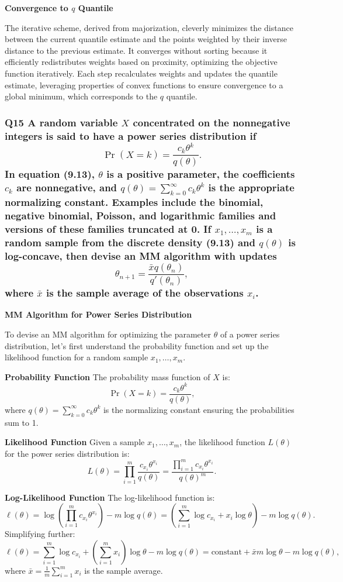 \documentclass[8pt]{article}
\begin{document}
{\textbf{Convergence to \(q\) Quantile}

The iterative scheme, derived from majorization, cleverly minimizes the distance between the current quantile estimate and the points weighted by their inverse distance to the previous estimate. It converges without sorting because it efficiently redistributes weights based on proximity, optimizing the objective function iteratively. Each step recalculates weights and updates the quantile estimate, leveraging properties of convex functions to ensure convergence to a global minimum, which corresponds to the \(q\) quantile.

\subsubsection*{Q15 A random variable \(X\) concentrated on the nonnegative integers is said to have a power series distribution if
\[
\Pr(X = k) = \frac{c_k \theta^k}{q(\theta)}.
\]
In equation (9.13), \(\theta\) is a positive parameter, the coefficients \(c_k\) are nonnegative, and \(q(\theta) = \sum_{k=0}^\infty c_k \theta^k\) is the appropriate normalizing constant. Examples include the binomial, negative binomial, Poisson, and logarithmic families and versions of these families truncated at 0. If \(x_1, \ldots, x_m\) is a random sample from the discrete density (9.13) and \(q(\theta)\) is log-concave, then devise an MM algorithm with updates
\[
\theta_{n+1} = \frac{\bar{x} q(\theta_n)}{q'(\theta_n)},
\]
where \(\bar{x}\) is the sample average of the observations \(x_i\).}

\textbf{MM Algorithm for Power Series Distribution}

To devise an MM algorithm for optimizing the parameter \(\theta\) of a power series distribution, let's first understand the probability function and set up the likelihood function for a random sample \(x_1, \ldots, x_m\).

\textbf{Probability Function}
The probability mass function of \(X\) is:
\[
\Pr(X = k) = \frac{c_k \theta^k}{q(\theta)},
\]
where \(q(\theta) = \sum_{k=0}^\infty c_k \theta^k\) is the normalizing constant ensuring the probabilities sum to 1.

\textbf{Likelihood Function}
Given a sample \(x_1, \ldots, x_m\), the likelihood function \(L(\theta)\) for the power series distribution is:
\[
L(\theta) = \prod_{i=1}^m \frac{c_{x_i} \theta^{x_i}}{q(\theta)} = \frac{\prod_{i=1}^m c_{x_i} \theta^{x_i}}{q(\theta)^m}.
\]

\textbf{Log-Likelihood Function}
The log-likelihood function is:
\[
\ell(\theta) = \log \left(\prod_{i=1}^m c_{x_i} \theta^{x_i}\right) - m \log q(\theta) = \left(\sum_{i=1}^m \log c_{x_i} + x_i \log \theta \right) - m \log q(\theta).
\]
Simplifying further:
\[
\ell(\theta) = \sum_{i=1}^m \log c_{x_i} + \left(\sum_{i=1}^m x_i\right) \log \theta - m \log q(\theta) = \text{constant} + \bar{x} m \log \theta - m \log q(\theta),
\]
where \(\bar{x} = \frac{1}{m} \sum_{i=1}^m x_i\) is the sample average.

}
\end{document}
